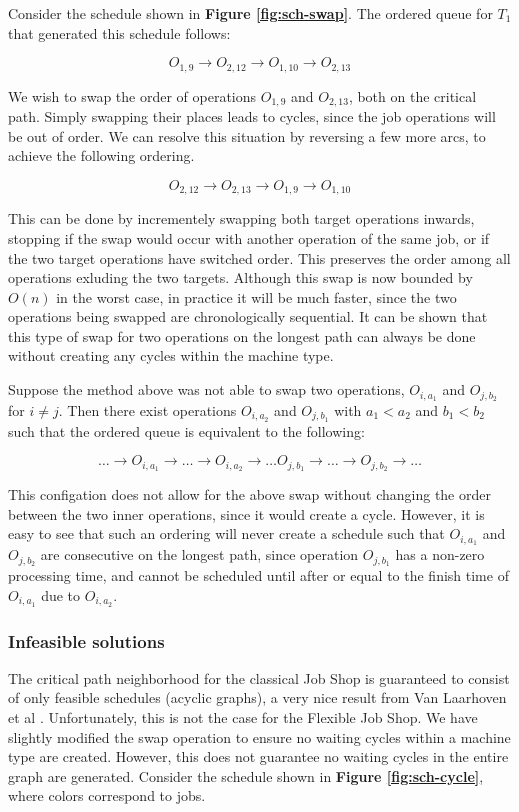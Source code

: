 \documentclass[a4paper,10pt]{article}
\begin{document}
Consider the schedule shown in \textbf{Figure \ref{fig:sch-swap}}. The ordered queue for $T_1$ that generated this schedule follows:

\[ O_{1,9} \rightarrow O_{2,12} \rightarrow O_{1,10} \rightarrow O_{2,13} \]

We wish to swap the order of operations $O_{1,9}$ and $O_{2,13}$, both on the critical path. Simply swapping their places leads to cycles, since the job operations will be out of order. We can resolve this situation by reversing a few more arcs, to achieve the following ordering.

\[ O_{2,12} \rightarrow O_{2,13} \rightarrow O_{1,9} \rightarrow O_{1,10} \]

This can be done by incrementely swapping both target operations inwards, stopping if the swap would occur with another operation of the same job, or if the two target operations have switched order. This preserves the order among all operations exluding the two targets. Although this swap is now bounded by $O(n)$ in the worst case, in practice it will be much faster, since the two operations being swapped are chronologically sequential. It can be shown that this type of swap for two operations on the longest path can always be done without creating any cycles within the machine type.

Suppose the method above was not able to swap two operations, $O_{i,a_1}$ and $O_{j,b_2}$ for $i \neq j$. Then there exist operations $O_{i,a_2}$ and $O_{j,b_1}$ with $a_1 < a_2$ and $b_1 < b_2$ such that the ordered queue is equivalent to the following:

\[ \dots \rightarrow O_{i,a_1} \rightarrow \dots \rightarrow O_{i,a_2} \rightarrow \dots O_{j,b_1}
\rightarrow \dots \rightarrow O_{j,b_2} \rightarrow \dots \]

This configation does not allow for the above swap without changing the order between the two inner operations, since it would create a cycle. However, it is easy to see that such an ordering will never create a schedule such that $O_{i,a_1}$ and $O_{j,b_2}$ are consecutive on the longest path, since operation $O_{j,b_1}$ has a non-zero processing time, and cannot be scheduled until after or equal to the finish time of $O_{i,a_1}$ due to $O_{i,a_2}$.

\subsubsection{Infeasible solutions}

The critical path neighborhood for the classical Job Shop is guaranteed to consist of only feasible schedules (acyclic graphs), a very nice result from Van Laarhoven et al \cite{simulatedannealingjsp}. Unfortunately, this is not the case for the Flexible Job Shop. We have slightly modified the swap operation to ensure no waiting cycles within a machine type are created. However, this does not guarantee no waiting cycles in the entire graph are generated. Consider the schedule shown in \textbf{Figure \ref{fig:sch-cycle}}, where colors correspond to jobs.
\end{document}

